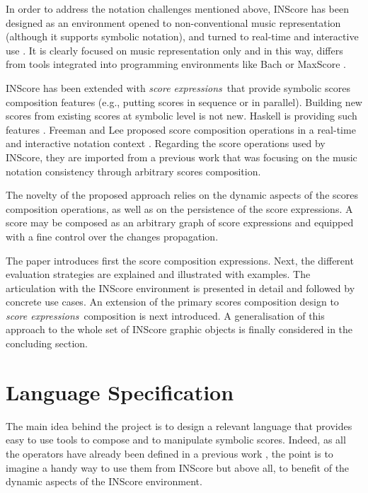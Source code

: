 \documentclass{article}
\newcommand{\sExpr}{\emph{score expressions}}
\begin{document}
In order to address the notation challenges mentioned above, INScore \cite{Fober:12a,fober14c} has been designed as an environment opened to non-conventional music representation (although it supports symbolic notation), and turned to real-time and interactive use \cite{Fober:13b, Fober:14b}. It is clearly focused on music representation only and in this way, differs from tools integrated into programming environments like Bach \cite{agostini12b} or MaxScore \cite{didko08}. 

INScore has been extended with \sExpr\ that provide symbolic scores composition features (e.g., putting scores in sequence or in parallel). Building new scores from existing scores at symbolic  level is not new. Haskell is providing such features \cite{Quick:2013:GAM:2505341.2505345}. Freeman and Lee proposed score composition operations in a real-time and interactive notation context \cite{Lee:2013}. Regarding the score operations used by INScore, they are imported from a previous work \cite{fober12b} that was focusing on the music notation consistency through arbitrary scores composition. 

The novelty of the proposed approach relies on the dynamic aspects of the scores composition operations, as well as on the persistence of the score expressions. A score may be composed as an arbitrary graph of score expressions and equipped with a fine control over the changes propagation.

The paper introduces first the score composition expressions. Next, the different evaluation strategies are explained and illustrated with examples. The articulation with the INScore environment is presented in detail and followed by concrete use cases. An extension of the primary scores composition design to \sExpr\ composition is next introduced. A generalisation of this approach to the whole set of INScore graphic objects is finally considered in the concluding section.  


\section{Language Specification}\label{language}
\label{languageSpec}
The main idea behind the project is to design a relevant language that provides easy to use tools to compose and to manipulate symbolic scores. Indeed, as all the operators have already been defined in a previous work \cite{fober12b}, the point is to imagine a handy way to use them from INScore but above all, to benefit of the dynamic aspects of the INScore environment.
\end{document}
